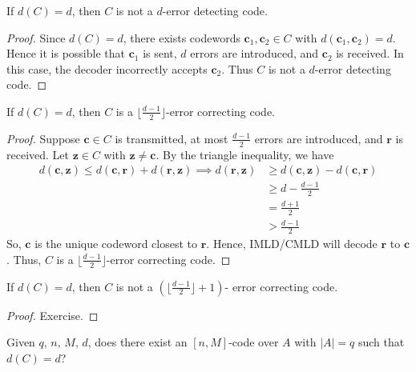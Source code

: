 \begin{Theorem}{}{}
    If $ d(C)=d $, then $ C $ is not a $ d $-error detecting code.
\end{Theorem}

\begin{proof}
    Since $ d(C)=d $, there exists codewords $ \bm{c}_1,\bm{c}_2\in C $
    with $ d(\bm{c}_1,\bm{c}_2)=d $. Hence it is possible that
    $ \bm{c}_1 $ is sent, $ d $ errors are introduced, and $ \bm{c}_2 $
    is received. In this case, the decoder incorrectly accepts
    $ \bm{c}_2 $. Thus $ C $ is not a $ d $-error detecting code.
\end{proof}

\begin{Theorem}{}{}
    If $ d(C)=d $, then $ C $ is a $ \bigl\lfloor \frac{d-1}{2} \bigr\rfloor $-error
    correcting code.
\end{Theorem}

\begin{proof}
    Suppose $ \bm{c}\in C $ is transmitted, at most $ \frac{d-1}{2}  $ errors
    are introduced, and $ \bm{r} $ is received.
    Let $ \bm{z}\in C $ with $ \bm{z}\neq \bm{c} $.
    By the triangle inequality, we have
    \begin{align*}
        d(\bm{c},\bm{z})\leqslant d(\bm{c},\bm{r})+d(\bm{r},\bm{z})\implies
        d(\bm{r},\bm{z})
         & \geqslant d(\bm{c},\bm{z})-d(\bm{c},\bm{r}) \\
         & \geqslant d-\frac{d-1}{2}                   \\
         & =\frac{d+1}{2}                              \\
         & >\frac{d-1}{2}
    \end{align*}
    So, $ \bm{c} $ is the unique codeword closest to $ \bm{r} $. Hence, IMLD/CMLD
    will decode $ \bm{r} $ to $ \bm{c} $. Thus, $ C $ is a
    $ \bigl\lfloor \frac{d-1}{2} \bigr\rfloor $-error correcting code.
\end{proof}

\begin{Theorem}{}{}
    If $ d(C)=d $, then $ C $ is not a $ \left( \bigr\lfloor \frac{d-1}{2}\bigl\rfloor +1 \right) $-
    error correcting code.
\end{Theorem}

\begin{proof}
    Exercise.
\end{proof}

Given $ q,\,n,\,M,\,d $, does there exist an $ [n,M] $-code over $ A $
with $ |A|=q $ such that $ d(C)=d $?

